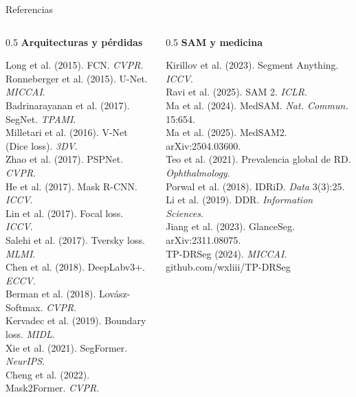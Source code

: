 \documentclass[aspectratio=169, 10pt]{beamer}
\begin{document}
\begin{frame}{Referencias}

	\begin{columns}[T]
		\begin{column}{0.5\textwidth}
			\textbf{\small Arquitecturas y p\'erdidas}
			\vspace{0.1cm}

			\scriptsize
			Long et al. (2015). FCN. \textit{CVPR}.\\
			Ronneberger et al. (2015). U-Net. \textit{MICCAI}.\\
			Badrinarayanan et al. (2017). SegNet. \textit{TPAMI}.\\
			Milletari et al. (2016). V-Net (Dice loss). \textit{3DV}.\\
			Zhao et al. (2017). PSPNet. \textit{CVPR}.\\
			He et al. (2017). Mask R-CNN. \textit{ICCV}.\\
			Lin et al. (2017). Focal loss. \textit{ICCV}.\\
			Salehi et al. (2017). Tversky loss. \textit{MLMI}.\\
			Chen et al. (2018). DeepLabv3+. \textit{ECCV}.\\
			Berman et al. (2018). Lov\'asz-Softmax. \textit{CVPR}.\\
			Kervadec et al. (2019). Boundary loss. \textit{MIDL}.\\
			Xie et al. (2021). SegFormer. \textit{NeurIPS}.\\
			Cheng et al. (2022). Mask2Former. \textit{CVPR}.
		\end{column}

		\begin{column}{0.5\textwidth}
			\textbf{\small SAM y medicina}
			\vspace{0.1cm}

			\scriptsize
			Kirillov et al. (2023). Segment Anything. \textit{ICCV}.\\
			Ravi et al. (2025). SAM 2. \textit{ICLR}.\\
			Ma et al. (2024). MedSAM. \textit{Nat. Commun.} 15:654.\\
			Ma et al. (2025). MedSAM2. arXiv:2504.03600.\\
			Teo et al. (2021). Prevalencia global de RD. \textit{Ophthalmology}.\\
			Porwal et al. (2018). IDRiD. \textit{Data} 3(3):25.\\
			Li et al. (2019). DDR. \textit{Information Sciences}.\\
			Jiang et al. (2023). GlanceSeg. arXiv:2311.08075.\\
			TP-DRSeg (2024). \textit{MICCAI}. github.com/wxliii/TP-DRSeg
		\end{column}
	\end{columns}

\end{frame}
\end{document}
